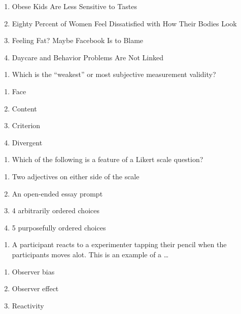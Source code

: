 \documentclass[
  12pt,
  letterpaper,
  DIV=11,
  numbers=noendperiod]{scrartcl}
\providecommand{\tightlist}{%
  \setlength{\itemsep}{0pt}\setlength{\parskip}{0pt}}\usepackage{longtable,booktabs,array}
\begin{document}
\begin{enumerate}
\def\labelenumi{\alph{enumi}.}
\tightlist
\item
  Obese Kids Are Less Sensitive to Tastes
\item
  Eighty Percent of Women Feel Dissatisfied with How Their Bodies Look
\item
  Feeling Fat? Maybe Facebook Is to Blame
\item
  Daycare and Behavior Problems Are Not Linked
\end{enumerate}

\begin{enumerate}
\def\labelenumi{\arabic{enumi}.}
\setcounter{enumi}{47}
\tightlist
\item
  Which is the ``weakest'' or most subjective measurement validity?
\end{enumerate}

\begin{enumerate}
\def\labelenumi{\alph{enumi}.}
\tightlist
\item
  Face
\item
  Content
\item
  Criterion
\item
  Divergent
\end{enumerate}

\newpage{}

\begin{enumerate}
\def\labelenumi{\arabic{enumi}.}
\setcounter{enumi}{48}
\tightlist
\item
  Which of the following is a feature of a Likert scale question?
\end{enumerate}

\begin{enumerate}
\def\labelenumi{\alph{enumi}.}
\tightlist
\item
  Two adjectives on either side of the scale
\item
  An open-ended essay prompt
\item
  4 arbitrarily ordered choices
\item
  5 purposefully ordered choices
\end{enumerate}

\begin{enumerate}
\def\labelenumi{\arabic{enumi}.}
\setcounter{enumi}{49}
\tightlist
\item
  A participant reacts to a experimenter tapping their pencil when the
  participants moves alot. This is an example of a \ldots{}
\end{enumerate}

\begin{enumerate}
\def\labelenumi{\alph{enumi}.}
\tightlist
\item
  Observer bias
\item
  Observer effect
\item
  Reactivity
\end{enumerate}
\end{document}
